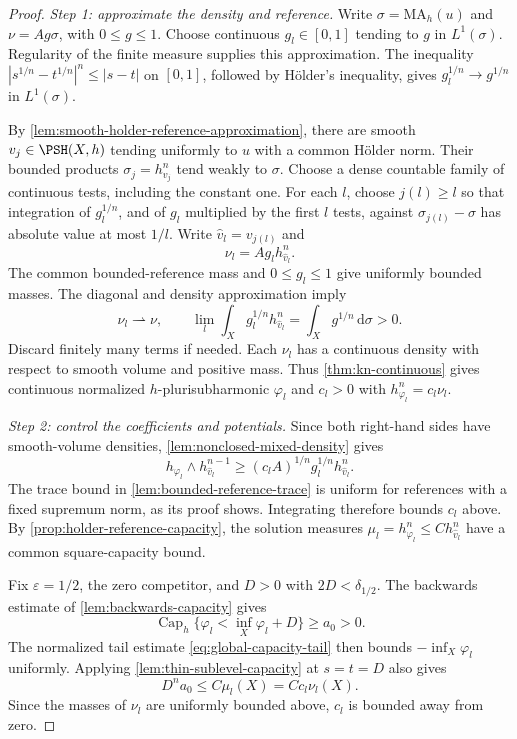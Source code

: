 \begin{proof}
\emph{Step 1: approximate the density and reference.} Write $\sigma=\mathrm{MA}_h(u)$ and $\nu=A g\sigma$, with $0\leq g\leq1$. Choose continuous $g_l\in[0,1]$ tending to $g$ in $L^1(\sigma)$. Regularity of the finite measure supplies this approximation. The inequality $|s^{1/n}-t^{1/n}|^n\leq|s-t|$ on $[0,1]$, followed by H\"older's inequality, gives $g_l^{1/n}\to g^{1/n}$ in $L^1(\sigma)$.

By \cref{lem:smooth-holder-reference-approximation}, there are smooth $v_j\in\PSH(X,h)$ tending uniformly to $u$ with a common H\"older norm. Their bounded products $\sigma_j=h_{v_j}^n$ tend weakly to $\sigma$. Choose a dense countable family of continuous tests, including the constant one. For each $l$, choose $j(l)\geq l$ so that integration of $g_l^{1/n}$, and of $g_l$ multiplied by the first $l$ tests, against $\sigma_{j(l)}-\sigma$ has absolute value at most $1/l$. Write $\widehat v_l=v_{j(l)}$ and
\[
 \nu_l=A g_l h_{\widehat v_l}^n.
\]
The common bounded-reference mass and $0\leq g_l\leq1$ give uniformly bounded masses. The diagonal and density approximation imply
\[
 \nu_l\rightharpoonup\nu,\qquad
 \lim_l\int_Xg_l^{1/n}h_{\widehat v_l}^n
 =\int_Xg^{1/n}\,\mathrm d\sigma>0.
\]
Discard finitely many terms if needed. Each $\nu_l$ has a continuous density with respect to smooth volume and positive mass. Thus \cref{thm:kn-continuous} gives continuous normalized $h$-plurisubharmonic $\varphi_l$ and $c_l>0$ with $h_{\varphi_l}^n=c_l\nu_l$.

\emph{Step 2: control the coefficients and potentials.} Since both right-hand sides have smooth-volume densities, \cref{lem:nonclosed-mixed-density} gives
\[
 h_{\varphi_l}\wedge h_{\widehat v_l}^{n-1}
 \geq(c_lA)^{1/n}g_l^{1/n}h_{\widehat v_l}^n.
\]
The trace bound in \cref{lem:bounded-reference-trace} is uniform for references with a fixed supremum norm, as its proof shows. Integrating therefore bounds $c_l$ above. By \cref{prop:holder-reference-capacity}, the solution measures $\mu_l=h_{\varphi_l}^n\leq C h_{\widehat v_l}^n$ have a common square-capacity bound.

Fix $\varepsilon=1/2$, the zero competitor, and $D>0$ with $2D<\delta_{1/2}$. The backwards estimate of \cref{lem:backwards-capacity} gives
\[
 \operatorname{Cap}_h\{\varphi_l<\inf_X\varphi_l+D\}\geq a_0>0.
\]
The normalized tail estimate \eqref{eq:global-capacity-tail} then bounds $-\inf_X\varphi_l$ uniformly. Applying \cref{lem:thin-sublevel-capacity} at $s=t=D$ also gives
\[
 D^na_0\leq C\mu_l(X)=Cc_l\nu_l(X).
\]
Since the masses of $\nu_l$ are uniformly bounded above, $c_l$ is bounded away from zero.


\end{proof}
